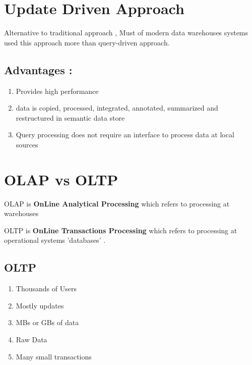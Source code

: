\documentclass[12pt]{article}
\begin{document}
\section{Update Driven Approach}
Alternative to traditional approach , Must of modern data warehouses systems used this approach more than query-driven approach.

\subsection{Advantages :}

\begin{enumerate}


\item Provides high performance

\item data is copied, processed, integrated, annotated, summarized 
and restructured in semantic data store

\item Query processing does not require an interface to process data at 
local sources

\end{enumerate}


\section{OLAP vs OLTP}

OLAP is \textbf{OnLine Analytical Processing} which refers to processing at warehouses

OLTP is \textbf{OnLine Transactions Processing} which refers to processing at operational systems 'databases' .

\subsection{OLTP}

\begin{enumerate}


\item Thousands of Users

\item Mostly updates

\item MBs or GBs of data

\item Raw Data

\item Many small transactions

\end{enumerate}
\end{document}
